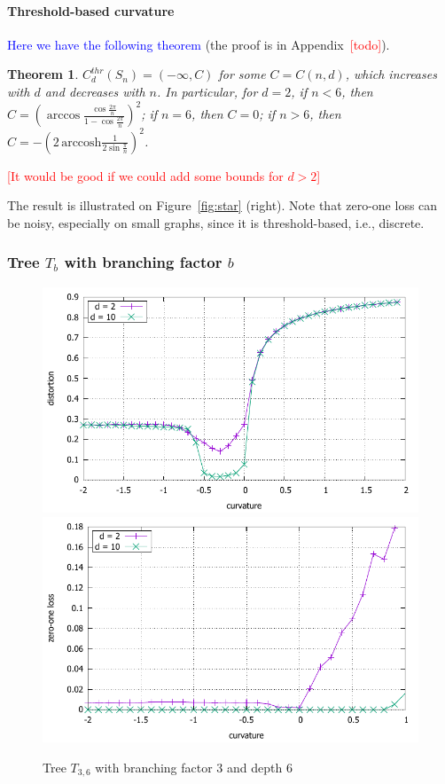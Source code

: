 \documentclass{article} %
\newtheorem{theorem}{Theorem}[section]
\newcommand{\ph}[1]{\textcolor{blue}{#1}}
\begin{document}
\paragraph{Threshold-based curvature} 
\ph{Here we have the following theorem} (the proof is in Appendix~\textcolor{red}{[todo]}).

\begin{theorem}\label{thm:star_threshold}
$C_d^{thr}(S_n) = (-\infty, C)$ for some $C = C(n,d)$, which increases with $d$ and decreases with $n$. In particular, for $d = 2$, if $n < 6$, then $C = \left(\arccos \frac{\cos \frac{2\pi}{n}}{1 - \cos \frac{2\pi}{n}}\right)^2$; if $n = 6$, then $C = 0$; if $n > 6$, then $C = - \left(2\,\mathrm{arccosh}\frac{1}{2\sin \frac{\pi}{n}}\right)^2$.
\end{theorem}

\textcolor{red}{[It would be good if we could add some bounds for $d > 2$]}

The result is illustrated on Figure~\ref{fig:star} (right). Note that zero-one loss can be noisy, especially on small graphs, since it is threshold-based, i.e., discrete.

\subsubsection{Tree $T_b$ with branching factor $b$}

\begin{figure}
    \centering
    \includegraphics[width = 0.49 \textwidth]{tree_3_6_distortion.pdf}
    \includegraphics[width = 0.49 \textwidth]{tree_3_6_zero_one.pdf}
    \caption{Tree $T_{3,6}$ with branching factor $3$ and depth $6$}
    \label{fig:tree}
\end{figure}
\end{document}
